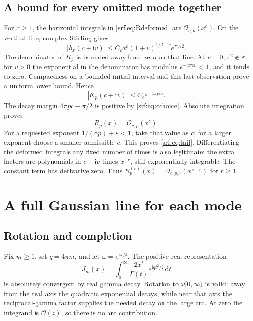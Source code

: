 \documentclass[11pt]{article}
\theoremstyle{remark}\newtheorem{remark}[theorem]{Remark}
\newcommand{\eps}{\varepsilon}
\newcommand{\OO}{\mathcal O}
\newcommand{\ii}{\mathrm i}
\newcommand{\dd}{\,\mathrm d}
\begin{document}
\subsection{A bound for every omitted mode together}
For $x\ge1$, the horizontal integrals in \eqref{srf:eq:Rdeformed} are $\OO_{c,p}(x^c)$. On the vertical line, complex Stirling gives
\begin{equation}\label{srf:eq:hbound}
 |h_x(c+\ii v)|\le C_cx^c(1+v)^{1/2-c}e^{\pi v/2}.
\end{equation}
The denominator of $K_p$ is bounded away from zero on that line. At $v=0$, $c^2\notin\mathbb Z$; for $v>0$ the exponential in the denominator has modulus $e^{-4\pi cv}<1$, and it tends to zero. Compactness on a bounded initial interval and this last observation prove a uniform lower bound. Hence
\begin{equation}\label{srf:eq:Kbound}
 |K_p(c+\ii v)|\le C_c e^{-4\pi pcv}.
\end{equation}
The decay margin $4\pi pc-\pi/2$ is positive by \eqref{srf:eq:cchoice}. Absolute integration proves
\begin{equation}\label{srf:eq:Rpower}
 R_p(x)=\OO_{c,p}(x^c).
\end{equation}
For a requested exponent $1/(8p)+\eps<1$, take that value as $c$; for a larger exponent choose a smaller admissible $c$. This proves \eqref{srf:eq:tail}. Differentiating the deformed integrals any fixed number of times is also legitimate: the extra factors are polynomials in $c+\ii v$ times $x^{-r}$, still exponentially integrable. The constant term has derivative zero. Thus $R_p^{(r)}(x)=\OO_{c,p,r}(x^{c-r})$ for $r\ge1$.

\section{A full Gaussian line for each mode}\label{srf:sec:gaussian}
\subsection{Rotation and completion}
Fix $m\ge1$, set $q=4\pi m$, and let $\omega=e^{\ii\pi/4}$. The positive-real representation
\[
 J_m(x)=\int_0^\infty\frac{2x^t}{\Gamma(t)}e^{\ii qt^2/2}\dd t
\]
is absolutely convergent by real gamma decay. Rotation to $\omega[0,\infty)$ is valid: away from the real axis the quadratic exponential decays, while near that axis the reciprocal-gamma factor supplies the needed decay on the large arc. At zero the integrand is $\OO(z)$, so there is no arc contribution.
\end{document}
